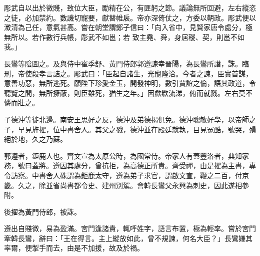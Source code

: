 \begin{pinyinscope}
 彫武自以出於微賤，致位大臣，勵精在公，有匪躬之節。議論無所回避，左右縱恣之徒，必加禁約。數譏切寵要，獻替帷扆。帝亦深倚仗之，方委以朝政。彫武便以澂清為己任，意氣甚高。嘗在朝堂謂鄭子信曰：「向入省中，見賢家唐令處分，極無所以。若作數行兵帳，彫武不如邕；若
 致主堯、舜，身居稷、契，則邕不如我。」



 長鸞等陰圖之。及與侍中崔季舒、黃門侍郎郭遵諫幸晉陽，為長鸞所譖，誅。臨刑，帝使段孝言詰之。彫武曰：「臣起自諸生，光寵隆洽。今者之諫，臣實首謀，意善功惡，無所逃死。願陛下珍愛金玉，開發神明，數引賈誼之倫，語其政道，令聽覽之間，無所擁蔽，則臣雖死，猶生之年。」因歔欷流涕，俯而就戮。左右莫不憐而壯之。



 子德沖等徙北邊。南安王思好之反，德沖及弟德揭俱免。德沖聰敏好學，以帝師之子，早見旌擢，位中書舍人。其父之戮，德沖並在殿廷就執，目見冤酷，號哭，殞絕於地，久之乃蘇。



 郭遵者，鉅鹿人也。齊文宣為太原公時，為國常侍。帝家人有蓋豐洛者，典知家務，號曰蓋將。遵因其處分，曾抗拒，為高德正所貴。齊受禪，由是擢為主書，專令訪察。中書舍人硃謂為鉅鹿太守，遵為弟子求官，謂啟文宣，鞭之二百，付京畿。久之，除並省尚書都令史、建州別駕。會韓長鸞父永興為刺史，因此遂相參附。



 後擢為黃門侍郎，被誅。



 遵出自賤微，易為盈滿。宮門逢諸貴，輒呼姓字，語言布置，極為輕率。嘗於宮門牽韓長鸞，辭曰：「王在得言。主上縱放如此，曾不規諫，何名大臣？」長鸞嫌其率爾，便掣手而去，由是不加援，故及於禍。



\end{pinyinscope}